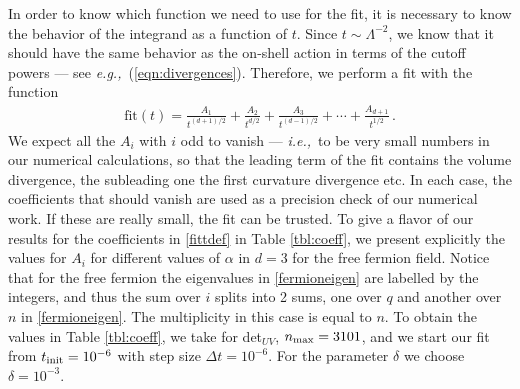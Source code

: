 \documentclass[12pt]{article}
\numberwithin{equation}{section}
\newcommand{\req}[1]{(\ref{#1})} %
\newcommand{\eg}{{\it e.g.,}\ }
\newcommand{\ie}{{\it i.e.,}\ }
\begin{document}
In order to know which function we need to use for the fit, it is necessary to know the behavior of the integrand as a function of $t$. Since $t \sim \Lambda^{-2}$, we know that it should have the same behavior as the on-shell action in terms of the cutoff powers --- see \eg \req{eqn:divergences}. Therefore, we perform a fit with the function
%
\begin{align}\label{fittdef}
	\textrm{fit}(t)= \frac{A_1}{t^{(d+1)/2}}+\frac{A_2}{t^{d/2}} + \frac{A_3}{t^{(d-1)/2}}+ \cdots  + \frac{A_{d+1}}{t^{1/2}} \, .
\end{align}
%
We expect all the $A_i$ with $i$ odd to vanish --- \ie to be very small numbers in our numerical calculations, so that the leading term of the fit contains the volume divergence, the subleading one the first curvature divergence etc. In each case, the coefficients that should vanish are used as a precision check of our numerical work. If these are really small, the fit can be trusted. To give a flavor of our results for the coefficients in \eqref{fittdef} in Table \ref{tbl:coeff}, we present explicitly the values for $A_i$ for different values of $\alpha$ in $d=3$ for the free fermion field. Notice that for the free fermion the eigenvalues in \eqref{fermioneigen} are labelled by the integers, and thus the sum over $i$ splits into 2 sums, one over $q$ and another over $n$ in \eqref{fermioneigen}. The multiplicity in this case is equal to $n$. To obtain the values in Table \ref{tbl:coeff}, we take for det$_{UV}$, $n_{\rm max}=3101$, and we start our fit from $t_{\rm init} = 10^{-6}$ with step size $\Delta t= 10^{-6}$. For the parameter $\delta$  we choose $\delta = 10^{-3}$. 
\end{document}
